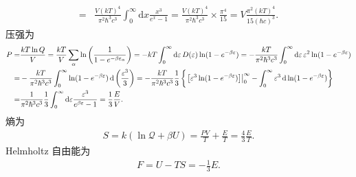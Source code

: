 \documentclass{assignment}
\begin{document}
\begin{pf}
\begin{align}
        =&\frac{V(kT)^4}{\pi^2\hbar^3c^3}\int_0^{\infty}\mathrm{d}x\frac{x^3}{e^x-1}=\frac{V(kT)^4}{\pi^2\hbar^3c^3}\times\frac{\pi^4}{15}=V\frac{\pi^2(kT)^4}{15(\hbar c)^3}.
    \end{align}
    压强为
    \begin{align}
        \notag P=&\frac{kT\ln Q}{V}=\frac{kT}{V}\sum_{\alpha}\ln\left(\frac{1}{1-e^{-\beta\varepsilon_{\alpha}}}\right)=-kT\int_0^{\infty}\mathrm{d}\varepsilon\,D(\varepsilon)\ln(1-e^{-\beta\varepsilon})=-\frac{kT}{\pi^2\hbar^3c^3}\int_0^{\infty}\mathrm{d}\varepsilon\,\varepsilon^2\ln(1-e^{-\beta\varepsilon})\\
        \notag=&-\frac{kT}{\pi^2\hbar^3c^3}\int_0^{\infty}\ln(1-e^{-\beta\varepsilon})\,\mathrm{d}\left(\frac{\varepsilon^3}{3}\right)=-\frac{kT}{\pi^2\hbar^3c^3}\frac{1}{3}\left\{\left.\left[\varepsilon^3\ln(1-e^{-\beta\varepsilon})\right]\right\rvert_0^{\infty}-\int_0^{\infty}\varepsilon^3\,\mathrm{d}\ln(1-e^{-\beta\varepsilon})\right\}\\
        \notag=&\frac{1}{\pi^2\hbar^3c^3}\frac{1}{3}\int_0^{\infty}\mathrm{d}\varepsilon\frac{\varepsilon^3}{e^{\beta\varepsilon}-1}=\frac{1}{3}\frac{E}{V}.
    \end{align}
    熵为
    \begin{align}
        S=k(\ln\mathcal{Q}+\beta U)=\frac{PV}{T}+\frac{E}{T}=\frac{4}{3}\frac{E}{T}.
    \end{align}
    Helmholtz 自由能为
    \begin{align}
        F=U-TS=-\frac{1}{3}E.
    \end{align}
\end{pf}
\end{document}
